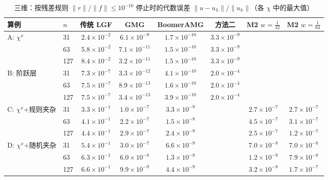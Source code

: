 \begin{table}[H]\centering\small
\caption{三维：按残差规则 $\|r\|/\|f\|\le10^{-10}$ 停止时的代数误差 $\|u-u_h\|/\|u_h\|$（各 $\chi$ 中的最大值）}\label{tab:err3d}
\begin{adjustbox}{max width=\textwidth}
\begin{tabular}{llcccccc}
\toprule
算例 & $n$ & 传统 LGF & GMG & BoomerAMG & 方法二 & M2 $w{=}\frac1{32}$ & M2 $w{=}\frac1{64}$ \\
\midrule
A: $\chi^x$ & 31 & $2.4{\times}10^{-2}$ & $6.1{\times}10^{-9}$ & $1.7{\times}10^{-10}$ & $3.3{\times}10^{-9}$ &  &  \\
 & 63 & $5.8{\times}10^{-2}$ & $7.1{\times}10^{-11}$ & $1.5{\times}10^{-10}$ & $3.3{\times}10^{-9}$ &  &  \\
 & 127 & $8.4{\times}10^{-2}$ & $3.2{\times}10^{-11}$ & $1.5{\times}10^{-10}$ & $3.3{\times}10^{-9}$ &  &  \\
\midrule
B: 阶跃层 & 31 & $7.3{\times}10^{-7}$ & $3.3{\times}10^{-12}$ & $4.1{\times}10^{-10}$ & $2.0{\times}10^{-4}$ &  &  \\
 & 63 & $7.5{\times}10^{-7}$ & $8.9{\times}10^{-13}$ & $1.6{\times}10^{-10}$ & $2.0{\times}10^{-4}$ &  &  \\
 & 127 & $7.5{\times}10^{-7}$ & $3.4{\times}10^{-13}$ & $3.9{\times}10^{-10}$ & $2.0{\times}10^{-4}$ &  &  \\
\midrule
C: $\chi^x$+规则夹杂 & 31 & $3.3{\times}10^{-1}$ & $1.0{\times}10^{-7}$ & $3.3{\times}10^{-9}$ &  & $2.7{\times}10^{-7}$ & $2.7{\times}10^{-7}$ \\
 & 63 & $4.1{\times}10^{-1}$ & $2.2{\times}10^{-7}$ & $1.5{\times}10^{-8}$ &  & $4.5{\times}10^{-7}$ & $3.1{\times}10^{-7}$ \\
 & 127 & $4.4{\times}10^{-1}$ & $2.9{\times}10^{-7}$ & $2.4{\times}10^{-9}$ &  & $2.5{\times}10^{-7}$ & $1.2{\times}10^{-7}$ \\
\midrule
D: $\chi^x$+随机夹杂 & 31 & $5.4{\times}10^{-1}$ & $3.0{\times}10^{-7}$ & $6.6{\times}10^{-9}$ &  & $7.0{\times}10^{-8}$ & $7.0{\times}10^{-8}$ \\
 & 63 & $6.3{\times}10^{-1}$ & $6.0{\times}10^{-8}$ & $1.3{\times}10^{-8}$ &  & $1.2{\times}10^{-8}$ & $7.9{\times}10^{-8}$ \\
 & 127 & $6.6{\times}10^{-1}$ & $9.9{\times}10^{-9}$ & $4.4{\times}10^{-9}$ &  & $3.2{\times}10^{-8}$ & $1.7{\times}10^{-7}$ \\
\bottomrule
\end{tabular}
\end{adjustbox}
\end{table}

